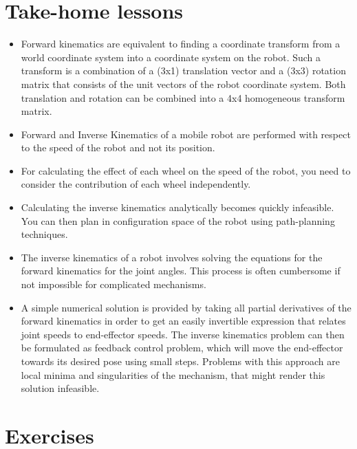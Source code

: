 
\section*{Take-home lessons}

\begin{itemize}
\item Forward kinematics are equivalent to finding a coordinate transform from a world coordinate system into a coordinate system on the robot. Such a transform is a combination of a (3x1) translation vector and a (3x3) rotation matrix that consists of the unit vectors of the robot coordinate system. Both translation and rotation can be combined into a 4x4 homogeneous transform matrix.
\item Forward and Inverse Kinematics of a mobile robot are performed with respect to the speed of the robot and not its position.
\item For calculating the effect of each wheel on the speed of the robot, you need to consider the contribution of each wheel independently.
\item Calculating the inverse kinematics analytically becomes quickly infeasible. You can then plan in configuration space of the robot using path-planning techniques.
\item The inverse kinematics of a robot involves solving the equations for the forward kinematics for the joint angles. This process is often cumbersome if not impossible for complicated mechanisms.
\item A simple numerical solution is provided by taking all partial derivatives of the forward kinematics in order to get an easily invertible expression that relates joint speeds to end-effector speeds.
The inverse kinematics problem can then be formulated as feedback control problem, which will move the end-effector towards its desired pose using small steps. Problems with this approach are local minima and singularities of the mechanism, that might render this solution infeasible.
\end{itemize}

\section*{Exercises}\small
